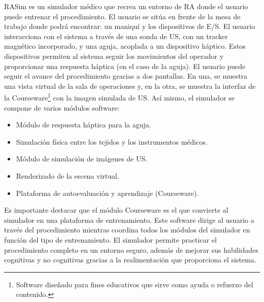 %
\ac{RASim} es un simulador médico que recrea un entorno de \ac{RA} donde el usuario puede entrenar el procedimiento. El usuario se sitúa en frente de la mesa de trabajo donde podrá encontrar: un maniquí y los dispositivos de \ac{E/S}.
El usuario interacciona con el sistema a través de una sonda de \ac{US}, con un \ac{tracker} magnético incorporado, y una aguja, acoplada a un dispositivo háptico. Estos dispositivos permiten al sistema seguir los movimientos del operador y proporcionar una respuesta háptica (en el caso de la aguja).
El usuario puede seguir el avance del procedimiento gracias a dos pantallas. En una, se muestra una vista virtual de la sala de operaciones  y, en la otra, se muestra la interfaz de la \ac{Courseware}\footnote{Software diseñado para fines educativos que sirve como ayuda o refuerzo del contenido.} con la imagen simulada de \ac{US}.
%
Así mismo, el simulador se compone de varios módulos software:
\begin{itemize}
    \item Módulo de respuesta háptica para la aguja.
    \item Simulación física entre los tejidos y los instrumentos médicos.
    \item Módulo de simulación de imágenes de \ac{US}.
    \item Renderizado de la escena virtual.
    \item Plataforma de autoevaluación y aprendizaje (\acs{Courseware}).
\end{itemize}

Es importante destacar que el módulo \ac{Courseware} es el que convierte al simulador en una plataforma de entrenamiento. Este software dirige al usuario a través del procedimiento mientras coordina todos los módulos del simulador en función del tipo de entrenamiento.  
%
El simulador permite practicar el procedimiento completo en un entorno seguro, además de mejorar sus habilidades cognitivas y no cognitivas gracias a la realimentación que proporciona el sistema.

